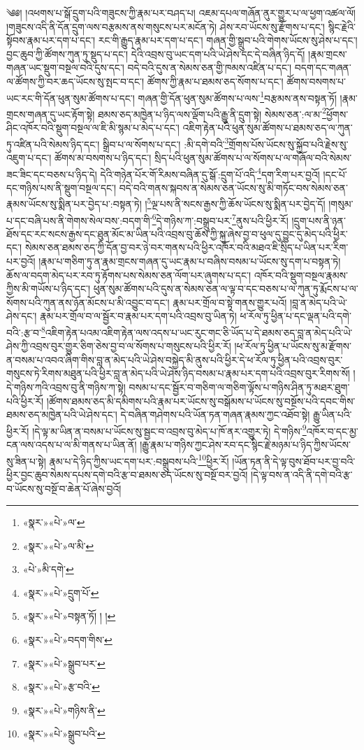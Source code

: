 ༄༅། །འཕགས་པ་སྒོ་དྲུག་པའི་གཟུངས་ཀྱི་རྣམ་པར་བཤད་པ། འཇམ་དཔལ་གཞོན་ནུར་གྱུར་པ་ལ་ཕྱག་འཚལ་ལོ། །གཟུངས་འདི་ནི་དོན་དྲུག་ལས་བརྩམས་ནས་གསུངས་པར་མངོན་ཏེ། ཤེས་རབ་ཡོངས་སུ་རྫོགས་པ་དང་། སྙིང་རྗེའི་སྟོབས་རྣམ་པར་དག་པ་དང་། རང་གི་རྒྱུད་རྣམ་པར་དག་པ་དང་། གཞན་གྱི་སྒྲུབ་པའི་གེགས་ཡོངས་སུ་ཤེས་པ་དང་། བྱང་ཆུབ་ཀྱི་ཚོགས་ཀུན་ཏུ་སྡུད་པ་དང་། དེའི་འབྲས་བུ་ཡང་དག་པའི་ཡེ་ཤེས་དང་དེ་བཞིན་ཉིད་དོ། །རྣམ་གྲངས་གཞན་ཡང་སྡུག་བསྔལ་བའི་དུས་དང་། བདེ་བའི་དུས་ན་སེམས་ཅན་གྱི་ཁམས་འཛིན་པ་དང་། བདག་དང་གཞན་ལ་ཚོགས་ཀྱི་བར་ཆད་ཡོངས་སུ་སྤང་བ་དང་། ཚོགས་ཀྱི་རྣམ་པ་ཐམས་ཅད་སོགས་པ་དང་། ཚོགས་བསགས་པ་ཡང་རང་གི་དོན་ཕུན་སུམ་ཚོགས་པ་དང་། གཞན་གྱི་དོན་ཕུན་སུམ་ཚོགས་པ་ལས་\footnote{«སྣར་»«པེ་»ལ་}བརྩམས་ནས་བསྟན་ཏོ། །རྣམ་གྲངས་གཞན་དུ་ཡང་རྟོག་སྟེ། ཐམས་ཅད་མཁྱེན་པ་ཉིད་ལས་ལྡོག་པའི་རྒྱུ་ནི་དྲུག་སྟེ། སེམས་ཅན་:ལ་མ་\footnote{«སྣར་»«པེ་»ལ་མི་}ཕྱོགས་ཤིང་འཁོར་བའི་སྡུག་བསྔལ་ལ་ཇི་མི་སྙམ་པ་མེད་པ་དང་། འཇིག་རྟེན་པའི་ཕུན་སུམ་ཚོགས་པ་ཐམས་ཅད་ལ་ཀུན་ཏུ་འཛིན་པའི་སེམས་ཉིད་དང་། སྒྲིབ་པ་ལ་སོགས་པ་དང་། :མི་དགེ་བའི་\footnote{«པེ་»མི་དགེ་}གྲོགས་པོས་ཡོངས་སུ་སྐྱོབ་པའི་རྗེས་སུ་འཇུག་པ་དང་། ཚོགས་མ་བསགས་པ་ཉིད་དང་། སྲིད་པའི་ཕུན་སུམ་ཚོགས་པ་ལ་སོགས་པ་ལ་གཞོལ་བའི་སེམས་ཟང་ཟིང་དང་བཅས་པ་ཉིད་དེ། དེའི་གཉེན་པོར་གོ་རིམས་བཞིན་དུ་སྒོ་:དྲུག་པོ་འདི་\footnote{«སྣར་»«པེ་»དྲུག་པོ་}དག་རིག་པར་བྱའོ། །དང་པོ་དང་གཉིས་པས་ནི་སྡུག་བསྔལ་དང་། བདེ་བའི་གནས་སྐབས་ན་སེམས་ཅན་ཡོངས་སུ་མི་གཏོང་བས་སེམས་ཅན་རྣམས་ཡོངས་སུ་སྨིན་པར་བྱེད་པ་:བསྟན་ཏེ། །\footnote{«སྣར་»«པེ་»བསྟན་ཏོ། ། །}ལྔ་པས་ནི་སངས་རྒྱས་ཀྱི་ཆོས་ཡོངས་སུ་སྨིན་པར་བྱེད་དོ། །གསུམ་པ་དང་བཞི་པས་ནི་གེགས་སེལ་བས་:བདག་གི་\footnote{«སྣར་»«པེ་»བདག་གིས་}དེ་གཉིས་ཀ་:བསྒྲུབ་པར་\footnote{«སྣར་»«པེ་»སྒྲུབ་པར་}ནུས་པའི་ཕྱིར་རོ། །དྲུག་པས་ནི་ཉན་ཐོས་དང་རང་སངས་རྒྱས་དང་ཐུན་མོང་མ་ཡིན་པའི་འབྲས་བུ་ཆོས་ཀྱི་སྐུ་ཞེས་བྱ་བ་ཕུལ་དུ་བྱུང་དུ་མེད་པའི་ཕྱིར་དང་། སེམས་ཅན་ཐམས་ཅད་ཀྱི་དོན་བྱ་བར་ཉེ་བར་གནས་པའི་ཕྱིར་འཁོར་བའི་མཐའ་ཇི་སྲིད་པ་ཡིན་པར་རིག་པར་བྱའོ། །རྣམ་པ་གཅིག་ཏུ་ན་རྣམ་གྲངས་གཞན་དུ་ཡང་རྣམ་པ་བཞིས་བསམ་པ་ཡོངས་སུ་དག་པ་བསྟན་ཏེ། ཆོས་ལ་བདག་མེད་པར་རབ་ཏུ་རྟོགས་པས་སེམས་ཅན་ལོག་པར་ཞུགས་པ་དང་། འཁོར་བའི་སྡུག་བསྔལ་རྣམས་ཀྱིས་མི་གཡོས་པ་ཉིད་དང་། ཕུན་སུམ་ཚོགས་པའི་དུས་ན་སེམས་ཅན་ལ་ལྟ་བ་དང་བཅས་པ་ལ་ཀུན་ཏུ་རྨོངས་པ་ལ་སོགས་པའི་ཀུན་ནས་ཉོན་མོངས་པ་མི་འབྱུང་བ་དང་། རྣམ་པར་གྲོལ་བ་སྟེ་གནས་གྱུར་པའོ། །བླ་ན་མེད་པའི་ཡེ་ཤེས་དང་། རྣམ་པར་གྲོལ་བ་ལ་སྦྱོར་བ་རྣམ་པར་དག་པའི་འབྲས་བུ་ཡིན་ཏེ། ཕ་རོལ་ཏུ་ཕྱིན་པ་དང་ལྡན་པའི་དགེ་བའི་:རྩ་བ་\footnote{«སྣར་»«པེ་»རྩ་བའི་}འཇིག་རྟེན་པའམ་འཇིག་རྟེན་ལས་འདས་པ་ཡང་རུང་གང་ཅི་ཡོད་པ་དེ་ཐམས་ཅད་བླ་ན་མེད་པའི་ཡེ་ཤེས་ཀྱི་འབྲས་བུར་གྱུར་ཅིག་ཅེས་བྱ་བ་ལ་སོགས་པ་གསུངས་པའི་ཕྱིར་རོ། །ཕ་རོལ་ཏུ་ཕྱིན་པ་ཡོངས་སུ་མ་རྫོགས་ན་བསམ་པ་འབའ་ཞིག་གིས་བླ་ན་མེད་པའི་ཡེ་ཤེས་བསྐྱེད་མི་ནུས་པའི་ཕྱིར་དེ་ཕ་རོལ་ཏུ་ཕྱིན་པའི་འབྲས་བུར་གསུངས་ཏེ་རིགས་མཐུན་པའི་ཕྱིར་བླ་ན་མེད་པའི་ཡེ་ཤེས་ཉིད་བསམ་པ་རྣམ་པར་དག་པའི་འབྲས་བུར་རིགས་སོ། །དེ་གཉིས་ཀའི་འབྲས་བུ་ནི་གཉིས་ཀ་སྟེ། བསམ་པ་དང་སྦྱོར་བ་གཅིག་ལ་གཅིག་ལྟོས་པ་གཉིས་ཤིན་ཏུ་མཐར་ཐུག་པའི་ཕྱིར་རོ། །ཚོགས་ཐམས་ཅད་མི་དམིགས་པའི་རྣམ་པར་ཡོངས་སུ་བསྒོམས་པ་ཡོངས་སུ་བསྔོས་པའི་དབང་གིས་ཐམས་ཅད་མཁྱེན་པའི་ཡེ་ཤེས་དང་། དེ་བཞིན་གཤེགས་པའི་ཡོན་ཏན་གཞན་རྣམས་ཀྱང་འཐོབ་སྟེ། རྒྱུ་ཡིན་པའི་ཕྱིར་རོ། །དེ་ལྟ་མ་ཡིན་ན་བསམ་པ་ཡོངས་སུ་སྦྱང་བ་འབྲས་བུ་མེད་པ་ཁོ་ནར་འགྱུར་ཏེ། དེ་གཉིས་\footnote{«སྣར་»«པེ་»གཉིས་ནི་}འཁོར་བ་དང་མྱ་ངན་ལས་འདས་པ་ལ་མི་གནས་པ་ཡིན་ནོ། །རྒྱུ་རྣམ་པ་གཉིས་ཀྱང་ཤེས་རབ་དང་སྙིང་རྗེ་མཉམ་པ་ཉིད་ཀྱིས་ཡོངས་སུ་ཟིན་པ་སྟེ། རྣམ་པ་དེ་ཉིད་ཀྱིས་ཡང་དག་པར་:བསྒྲུབས་པའི་\footnote{«སྣར་»«པེ་»སྒྲུབ་པའི་}ཕྱིར་རོ། །ཡོན་ཏན་ནི་དེ་ལྟ་བུས་ཐོབ་པར་བྱ་བའི་ཕྱིར་བྱང་ཆུབ་སེམས་དཔས་དགེ་བའི་རྩ་བ་ཐམས་ཅད་ཡོངས་སུ་བསྔོ་བར་བྱའོ། །དེ་ལྟ་བས་ན་འདི་ནི་དགེ་བའི་རྩ་བ་ཡོངས་སུ་བསྔོ་བ་ཆེན་པོ་ཞེས་བྱའོ། 